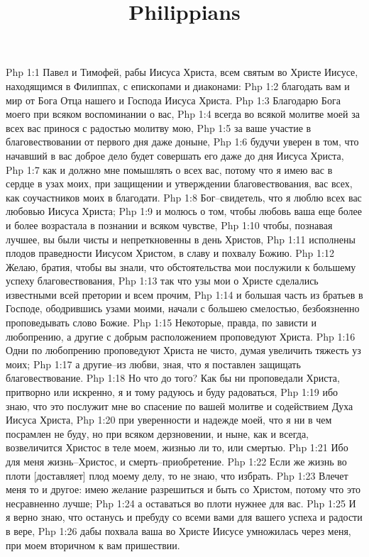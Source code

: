 

\title{Philippians}

Php 1:1  Павел и Тимофей, рабы Иисуса Христа, всем святым во Христе Иисусе, находящимся в Филиппах, с епископами и диаконами:
Php 1:2  благодать вам и мир от Бога Отца нашего и Господа Иисуса Христа.
Php 1:3  Благодарю Бога моего при всяком воспоминании о вас,
Php 1:4  всегда во всякой молитве моей за всех вас принося с радостью молитву мою,
Php 1:5  за ваше участие в благовествовании от первого дня даже доныне,
Php 1:6  будучи уверен в том, что начавший в вас доброе дело будет совершать его даже до дня Иисуса Христа,
Php 1:7  как и должно мне помышлять о всех вас, потому что я имею вас в сердце в узах моих, при защищении и утверждении благовествования, вас всех, как соучастников моих в благодати.
Php 1:8  Бог--свидетель, что я люблю всех вас любовью Иисуса Христа;
Php 1:9  и молюсь о том, чтобы любовь ваша еще более и более возрастала в познании и всяком чувстве,
Php 1:10  чтобы, познавая лучшее, вы были чисты и непреткновенны в день Христов,
Php 1:11  исполнены плодов праведности Иисусом Христом, в славу и похвалу Божию.
Php 1:12  Желаю, братия, чтобы вы знали, что обстоятельства мои послужили к большему успеху благовествования,
Php 1:13  так что узы мои о Христе сделались известными всей претории и всем прочим,
Php 1:14  и большая часть из братьев в Господе, ободрившись узами моими, начали с большею смелостью, безбоязненно проповедывать слово Божие.
Php 1:15  Некоторые, правда, по зависти и любопрению, а другие с добрым расположением проповедуют Христа.
Php 1:16  Одни по любопрению проповедуют Христа не чисто, думая увеличить тяжесть уз моих;
Php 1:17  а другие--из любви, зная, что я поставлен защищать благовествование.
Php 1:18  Но что до того? Как бы ни проповедали Христа, притворно или искренно, я и тому радуюсь и буду радоваться,
Php 1:19  ибо знаю, что это послужит мне во спасение по вашей молитве и содействием Духа Иисуса Христа,
Php 1:20  при уверенности и надежде моей, что я ни в чем посрамлен не буду, но при всяком дерзновении, и ныне, как и всегда, возвеличится Христос в теле моем, жизнью ли то, или смертью.
Php 1:21  Ибо для меня жизнь--Христос, и смерть--приобретение.
Php 1:22  Если же жизнь во плоти [доставляет] плод моему делу, то не знаю, что избрать.
Php 1:23  Влечет меня то и другое: имею желание разрешиться и быть со Христом, потому что это несравненно лучше;
Php 1:24  а оставаться во плоти нужнее для вас.
Php 1:25  И я верно знаю, что останусь и пребуду со всеми вами для вашего успеха и радости в вере,
Php 1:26  дабы похвала ваша во Христе Иисусе умножилась через меня, при моем вторичном к вам пришествии.
